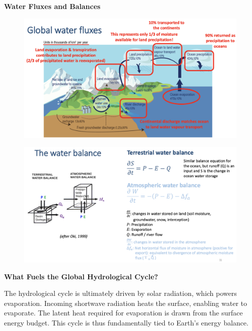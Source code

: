\documentclass[fontsize=8pt, a4paper, landscape, fleqn]{scrartcl}
\renewcommand{\subsection}[1]{%
    \noindent\colorbox{subsectioncolor}{%
        \parbox{\dimexpr\columnwidth-2\fboxsep}{\color{white}\textbf{#1}}}%
    \vspace{0.5mm}%
}
\begin{document}
\begin{multicols*}{3}[\raggedcolumns]
\subsection{Water Fluxes and Balances}
\begin{figure}[H]
    \centering
    \includegraphics[width=1\linewidth]{CS//img/Water_flux.png}
\end{figure}

\begin{figure}[H]
    \centering
    \includegraphics[width=1\linewidth]{CS/img/Water_balance.png}
\end{figure}

\subsection{What Fuels the Global Hydrological Cycle?}
The hydrological cycle is ultimately driven by solar radiation, which powers evaporation. Incoming shortwave radiation heats the surface, enabling water to evaporate. The latent heat required for evaporation is drawn from the surface energy budget. This cycle is thus fundamentally tied to Earth's energy balance.


\end{multicols*}
\end{document}
